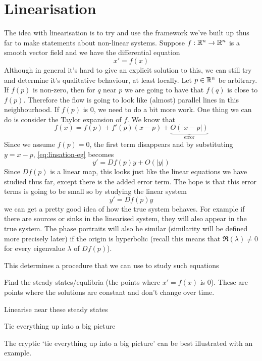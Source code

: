 \section{Linearisation}
The idea with linearisation is to try and use the framework we've built up thus far to make statements about non-linear systems.
Suppose $f: \mathbb{R}^n \to \mathbb{R}^n$ is a smooth vector field and we have the differential equation
\begin{equation}\label{eq:linsation-eg}
    x' = f(x)
\end{equation}
Although in general it's hard to give an explicit solution to this, we can still try and determine it's qualitative behaviour, at least locally. Let $p \in \mathbb{R}^n$ be arbitrary. If $f(p)$ is non-zero, then for $q$ near $p$ we are going to have that $f(q)$ is close to $f(p)$. Therefore the flow is going to look like (almost) parallel lines in this neighbourhood. If $f(p)$ is 0, we need to do a bit more work. One thing we can do is consider the Taylor expansion of $f$. We know that
$$ f(x) = f(p) + f'(p)(x - p) + \underbrace{O(\left|x - p\right|)}_{\text{error}} $$
Since we assume $f(p) = 0$, the first term disappears and by substituting $y = x - p$, \autoref{eq:linsation-eg} becomes
$$ y' = Df(p)y + O(\left|y\right|) $$
Since $Df(p)$ is a linear map, this looks just like the linear equations we have studied thus far, except there is the added error term. The hope is that this error terms is going to be small so by studying the linear system
$$ y' = Df(p) y $$
we can get a pretty good idea of how the true system behaves. For example if there are sources or sinks in the linearised system, they will also appear in the true system. The phase portraits will also be similar (similarity will be defined more precisely later) if the origin is hyperbolic (recall this means that $\Re(\lambda) \neq 0$ for every eigenvalue $\lambda$ of $Df(p)$).

This determines a procedure that we can use to study such equations
\begin{minenumerate}
    \item Find the steady states/equlibria (the points where $x' = f(x)$ is 0). These are points where the solutions are constant and don't change over time.
    \item Linearise near these steady states
    \item Tie everything up into a big picture
\end{minenumerate}
The cryptic `tie everything up into a big picture' can be best illustrated with an example.


